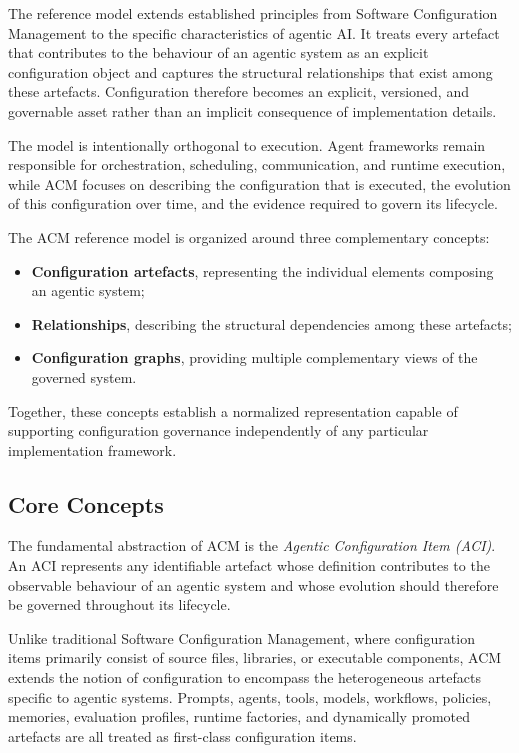 \documentclass[10pt]{article}
\begin{document}
The reference model extends established principles from Software Configuration Management to the specific characteristics of agentic AI. It treats every artefact that contributes to the behaviour of an agentic system as an explicit configuration object and captures the structural relationships that exist among these artefacts. Configuration therefore becomes an explicit, versioned, and governable asset rather than an implicit consequence of implementation details.

The model is intentionally orthogonal to execution. Agent frameworks remain responsible for orchestration, scheduling, communication, and runtime execution, while ACM focuses on describing the configuration that is executed, the evolution of this configuration over time, and the evidence required to govern its lifecycle.

The ACM reference model is organized around three complementary concepts:

\begin{itemize}
    \item \textbf{Configuration artefacts}, representing the individual elements composing an agentic system;
    \item \textbf{Relationships}, describing the structural dependencies among these artefacts;
    \item \textbf{Configuration graphs}, providing multiple complementary views of the governed system.
\end{itemize}

Together, these concepts establish a normalized representation capable of supporting configuration governance independently of any particular implementation framework.

\subsection{Core Concepts}
\label{sec:core_concepts}

The fundamental abstraction of ACM is the \emph{Agentic Configuration Item (ACI)}. An ACI represents any identifiable artefact whose definition contributes to the observable behaviour of an agentic system and whose evolution should therefore be governed throughout its lifecycle.

Unlike traditional Software Configuration Management, where configuration items primarily consist of source files, libraries, or executable components, ACM extends the notion of configuration to encompass the heterogeneous artefacts specific to agentic systems. Prompts, agents, tools, models, workflows, policies, memories, evaluation profiles, runtime factories, and dynamically promoted artefacts are all treated as first-class configuration items.
\end{document}
